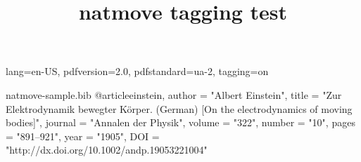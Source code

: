 \DocumentMetadata
  {
    lang=en-US,
    pdfversion=2.0,
    pdfstandard=ua-2,
    tagging=on
  }
\begin{filecontents}{natmove-sample.bib}
@article{einstein,
    author =       "Albert Einstein",
    title =        "{Zur Elektrodynamik bewegter K{\"o}rper}. ({German})
        [{On} the electrodynamics of moving bodies]",
    journal =      "Annalen der Physik",
    volume =       "322",
    number =       "10",
    pages =        "891--921",
    year =         "1905",
    DOI =          "http://dx.doi.org/10.1002/andp.19053221004"
}
\end{filecontents}

\documentclass{article}

\usepackage[numbers,super]{natbib}
\usepackage{natmove}
\usepackage{hyperref}

\title{natmove tagging test}



Some text \cite{einstein} some more text.

Some text ending a sentence \cite{einstein}.




